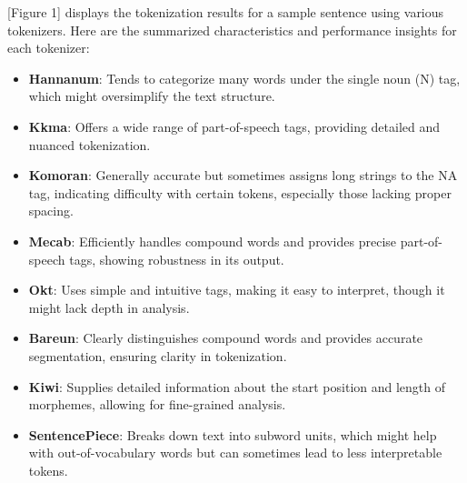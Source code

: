 \documentclass{article}
\begin{document}
       
[Figure 1] displays the tokenization results for a sample sentence using various tokenizers. Here are the summarized characteristics and performance insights for each tokenizer:

\begin{itemize}
    \item \textbf{Hannanum}: Tends to categorize many words under the single noun (N) tag, which might oversimplify the text structure.
    \item \textbf{Kkma}: Offers a wide range of part-of-speech tags, providing detailed and nuanced tokenization.
    \item \textbf{Komoran}: Generally accurate but sometimes assigns long strings to the NA tag, indicating difficulty with certain tokens, especially those lacking proper spacing.
    \item \textbf{Mecab}: Efficiently handles compound words and provides precise part-of-speech tags, showing robustness in its output.
    \item \textbf{Okt}: Uses simple and intuitive tags, making it easy to interpret, though it might lack depth in analysis.
    \item \textbf{Bareun}: Clearly distinguishes compound words and provides accurate segmentation, ensuring clarity in tokenization.
    \item \textbf{Kiwi}: Supplies detailed information about the start position and length of morphemes, allowing for fine-grained analysis.
    \item \textbf{SentencePiece}: Breaks down text into subword units, which might help with out-of-vocabulary words but can sometimes lead to less interpretable tokens.
\end{itemize}
\end{document}
